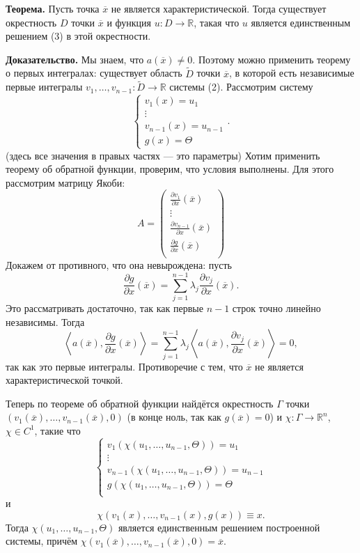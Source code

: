 \textbf{Теорема.} Пусть точка $\overline x$ не является характеристической.
Тогда существует окрестность $D$ точки $\overline x$ и функция $u: D \to \mathbb R$, такая что $u$ является единственным решением (3) в этой окрестности.

\textbf{Доказательство.} Мы знаем, что $a(\overline x) \ne 0$.
Поэтому можно применить теорему о первых интегралах: существует область $\widetilde D$ точки $\overline x$, в которой есть независимые первые интегралы $v_1, \dots, v_{n-1}: \widetilde D \to \mathbb R$ системы (2).
Рассмотрим систему
\[
    \begin{cases}
        v_1(x) = u_1 \\
        \vdots \\
        v_{n-1}(x) = u_{n-1} \\
        g(x) = \Theta
    \end{cases}.
\]
(здесь все значения в правых частях --- это параметры)
Хотим применить теорему об обратной функции, проверим, что условия выполнены.
Для этого рассмотрим матрицу Якоби:
\[
    A = 
    \begin{pmatrix}
        \frac{\partial v_1}{\partial x}(\overline x) \\
        \vdots \\
        \frac{\partial v_{n-1}}{\partial x}(\overline x) \\
        \frac{\partial g}{\partial x}(\overline x) \\
    \end{pmatrix}
\]
Докажем от противного, что она невырождена: пусть
\[
    \frac{\partial g}{\partial x}(\overline x) = \sum_{j=1}^{n-1} \lambda_j \frac{\partial v_j}{\partial x}(\overline x).
\]
Это рассматривать достаточно, так как первые $n - 1$ строк точно линейно независимы.
Тогда
\[
    \left< a(\overline x), \frac{\partial g}{\partial x}(\overline x) \right> = \sum_{j=1}^{n-1} \lambda_j \left< a(\overline x), \frac{\partial v_j}{\partial x}(\overline x) \right> = 0,
\]
так как это первые интегралы.
Противоречие с тем, что $\overline x$ не является характеристической точкой.

Теперь по теореме об обратной функции найдётся окрестность $\Gamma$ точки $(v_1(\overline x), \dots, v_{n-1}(\overline x), 0)$ (в конце ноль, так как $g(\overline x) = 0$) и $\chi: \Gamma \to \mathbb R^n$, $\chi \in C^1$, такие что
\[
    \begin{cases}
        v_1(\chi(u_1, \dots, u_{n-1}, \Theta)) = u_1 \\
        \vdots \\
        v_{n-1}(\chi(u_1, \dots, u_{n-1}, \Theta)) = u_{n-1} \\
        g(\chi(u_1, \dots, u_{n-1}, \Theta)) = \Theta \\
    \end{cases}
\]
и
\[
    \chi(v_1(x), \dots, v_{n-1}(x), g(x)) \equiv x.
\]
Тогда $\chi(u_1, \dots, u_{n-1}, \Theta)$ является единственным решением построенной системы, причём $\chi(v_1(\overline x), \dots, v_{n-1}(\overline x), 0) = \overline x$.

